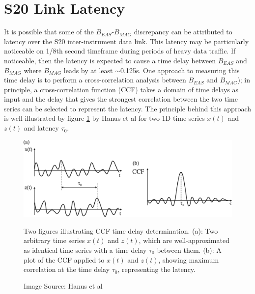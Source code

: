 \blindtext

\section{S20 Link Latency}
It is possible that some of the \(B_{EAS}\)-\(B_{MAG}\) discrepancy can be attributed to latency over the S20 inter-instrument data link\cite{owen2021}.  This latency may be particularly noticeable on 1/8th second timeframe during periods of heavy data traffic\cite{owen2021}. If noticeable, then the latency is expected to cause a time delay between \(B_{EAS}\) and \(B_{MAG}\) where \(B_{MAG}\) leads by at least \(\sim\)0.125s. One approach to measuring this time delay is to perform a cross-correlation analysis between \(B_{EAS}\) and \(B_{MAG}\)\cite{hanus2019}); in principle, a cross-correlation function (CCF) takes a domain of time delays as input and the delay that gives the strongest correlation between the two time series can be selected to represent the latency. The principle behind this approach is well-illustrated by figure \ref{fig: Hanus CCF} by Hanus et al\cite{hanus2019} for two 1D time series \(x(t)\) and \(z(t)\) and latency \(\tau_0\).

\begin{figure}[h!]
    \centering
    \includegraphics[width=1\linewidth]{figures/hanus diagram.jpg}
    \caption{Two figures illustrating CCF time delay determination. (a): Two arbitrary time series \(x(t)\) and \(z(t)\), which are well-approximated as identical time series with a time delay \(\tau_0\) between them. (b): A plot of the CCF applied to \(x(t)\) and \(z(t)\), showing maximum correlation at the time delay \(\tau_0\), representing the latency.}
    \caption*{Image Source: Hanus et al\cite{hanus2019}}
    \label{fig: Hanus CCF}
\end{figure}

\blindtext

